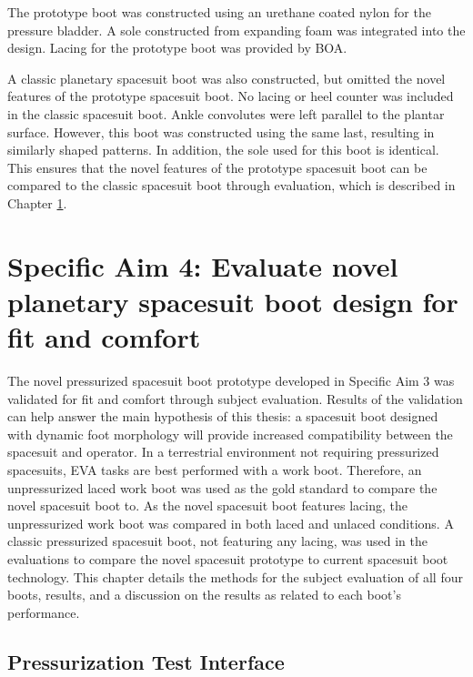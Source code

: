 \documentclass[defaultstyle,11pt]{thesis}
\begin{document}
The prototype boot was constructed using an urethane coated nylon for the pressure bladder.
A sole constructed from expanding foam was integrated into the design.
Lacing for the prototype boot was provided by BOA.

A classic planetary spacesuit boot was also constructed, but omitted the novel features of the prototype spacesuit boot.
No lacing or heel counter was included in the classic spacesuit boot.
Ankle convolutes were left parallel to the plantar surface.
However, this boot was constructed using the same last, resulting in similarly shaped patterns.
In addition, the sole used for this boot is identical.
This ensures that the novel features of the prototype spacesuit boot can be compared to the classic spacesuit boot through evaluation, which is described in Chapter \ref{sec:SA4}.

\hypertarget{sec:SA4}{%
\chapter{Specific Aim 4: Evaluate novel planetary spacesuit boot design for fit and comfort}\label{sec:SA4}}

The novel pressurized spacesuit boot prototype developed in Specific Aim 3 was validated for fit and comfort through subject evaluation.
Results of the validation can help answer the main hypothesis of this thesis: a spacesuit boot designed with dynamic foot morphology will provide increased compatibility between the spacesuit and operator.
In a terrestrial environment not requiring pressurized spacesuits, EVA tasks are best performed with a work boot.
Therefore, an unpressurized laced work boot was used as the gold standard to compare the novel spacesuit boot to.
As the novel spacesuit boot features lacing, the unpressurized work boot was compared in both laced and unlaced conditions.
A classic pressurized spacesuit boot, not featuring any lacing, was used in the evaluations to compare the novel spacesuit prototype to current spacesuit boot technology.
This chapter details the methods for the subject evaluation of all four boots, results, and a discussion on the results as related to each boot's performance.

\hypertarget{pressurization-test-interface}{%
\section{Pressurization Test Interface}\label{pressurization-test-interface}}
\end{document}
